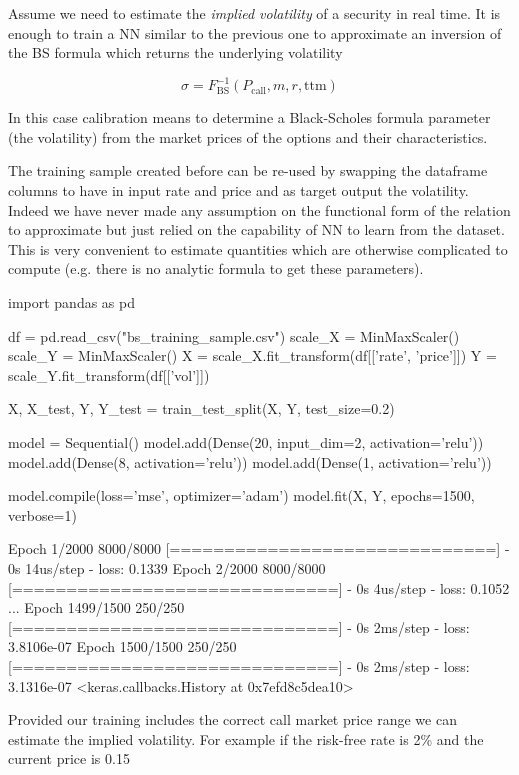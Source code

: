 Assume we need to estimate the \emph{implied volatility} of a security in real time. It is enough to train a NN similar to the previous one to approximate an inversion of the BS formula which returns the underlying volatility

\begin{equation} 
\sigma = F^{-1}_\textrm{BS}(P_\textrm{call}, m, r, \mathrm{ttm})
\end{equation}

In this case calibration means to determine a Black-Scholes formula parameter (the volatility) from the market prices of the options and their characteristics.

The training sample created before can be re-used by swapping the dataframe columns to have in input rate and price and as target output the volatility. 
Indeed we have never made any assumption on the functional form of the relation to approximate but just relied on the capability of NN to learn from the dataset.
This is very convenient to estimate quantities which are otherwise complicated to compute (e.g. there is no analytic formula to get these parameters).
 
\begin{ipython}
import pandas as pd

df = pd.read_csv("bs_training_sample.csv")
scale_X = MinMaxScaler()
scale_Y = MinMaxScaler()
X = scale_X.fit_transform(df[['rate', 'price']])
Y = scale_Y.fit_transform(df[['vol']])

X, X_test, Y, Y_test = train_test_split(X, Y, test_size=0.2)

model = Sequential()
model.add(Dense(20, input_dim=2, activation='relu'))
model.add(Dense(8, activation='relu'))
model.add(Dense(1, activation='relu'))

model.compile(loss='mse', optimizer='adam')
model.fit(X, Y, epochs=1500, verbose=1)
\end{ipython}
\begin{ioutput}
Epoch 1/2000
8000/8000 [==============================] - 0s 14us/step - loss: 0.1339
Epoch 2/2000
8000/8000 [==============================] - 0s 4us/step - loss: 0.1052
...
Epoch 1499/1500
250/250 [==============================] - 0s 2ms/step - loss: 3.8106e-07
Epoch 1500/1500
250/250 [==============================] - 0s 2ms/step - loss: 3.1316e-07
<keras.callbacks.History at 0x7efd8c5dea10>
\end{ioutput}

Provided our training includes the correct call market price range we can estimate the implied volatility. For example if the risk-free rate is 2\% and the current price is 0.15 

